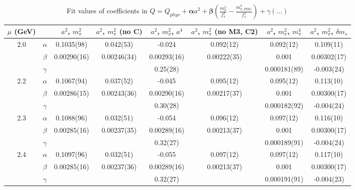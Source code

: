\documentclass[12pt]{extarticle}
\begin{document}
\begin{table}[h!]
\begin{center}
\begin{tabular}{|c c|c|c|c|c|c|c|}
\hline
$\mu$ (GeV) &  & $a^2$, $m_\pi^2$& $a^2$, $m_\pi^2$ (no C)& $a^2$, $m_\pi^2$, $a^4$& $a^2$, $m_\pi^2$ (no M3, C2)& $a^2$, $m_\pi^2$, $m_\pi^4$& $a^2$, $m_\pi^2$, $\delta m_s$\\
\hline
\multirow{3}{0.5in}{2.0} & $\alpha$ & 0.1035(98)& 0.042(53)& -0.024& 0.092(12)& 0.092(12)& 0.109(11)\\
 & $\beta$ & 0.00290(16)& 0.00246(34)& 0.00293(16)& 0.00222(35)& 0.001& 0.00302(17)\\
 & $\gamma$ &  &  & 0.25(28)&  & 0.000181(89)& -0.003(24)\\
\hline
\multirow{3}{0.5in}{2.2} & $\alpha$ & 0.1067(94)& 0.037(52)& -0.045& 0.095(12)& 0.095(12)& 0.113(10)\\
 & $\beta$ & 0.00286(15)& 0.00243(36)& 0.00290(16)& 0.00217(37)& 0.001& 0.00300(17)\\
 & $\gamma$ &  &  & 0.30(28)&  & 0.000182(92)& -0.004(24)\\
\hline
\multirow{3}{0.5in}{2.3} & $\alpha$ & 0.1088(96)& 0.032(51)& -0.054& 0.096(12)& 0.097(12)& 0.116(10)\\
 & $\beta$ & 0.00285(16)& 0.00237(35)& 0.00289(16)& 0.00213(37)& 0.001& 0.00300(17)\\
 & $\gamma$ &  &  & 0.32(27)&  & 0.000189(91)& -0.004(24)\\
\hline
\multirow{3}{0.5in}{2.4} & $\alpha$ & 0.1097(96)& 0.032(51)& -0.055& 0.097(12)& 0.097(12)& 0.117(10)\\
 & $\beta$ & 0.00285(16)& 0.00237(36)& 0.00289(16)& 0.00213(37)& 0.001& 0.00300(17)\\
 & $\gamma$ &  &  & 0.32(27)&  & 0.000191(91)& -0.004(23)\\
\hline
\end{tabular}
\caption{Fit values of coefficients in $Q = Q_{phys} + \mathbf{\alpha} a^2 + \mathbf{\beta}\left(\frac{m_\pi^2}{f_\pi^2}-\frac{m_{\pi,PDG}^2}{f_\pi^2}\right) + \gamma(\ldots)$}
\end{center}
\end{table}







\end{document}
